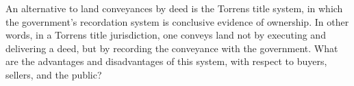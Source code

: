 
\item An alternative to land conveyances by deed is the Torrens title system, in
which the government's recordation system is conclusive evidence of ownership.
In other words, in a Torrens title jurisdiction, one conveys land not by
executing and delivering a deed, but by recording the conveyance with the
government. What are the advantages and disadvantages of this system, with
respect to buyers, sellers, and the public?

\endedit
